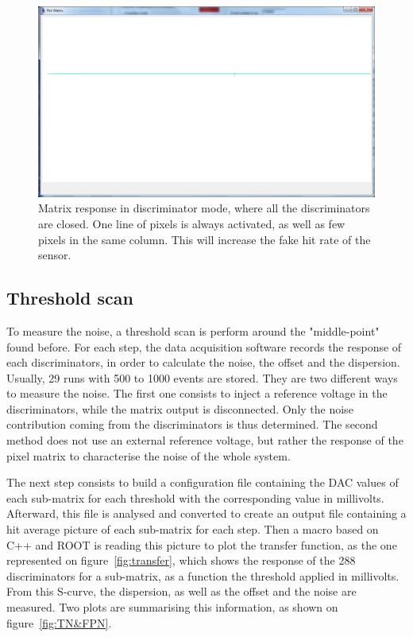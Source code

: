   \begin{figure}[!h]
    \centering
    \includegraphics[width=\textwidth]{Pictures/labTests/th255.png}
    \caption{Matrix response in discriminator mode, where all the discriminators are closed. One line of pixels is always activated, as well as few pixels in the same column. This will increase the fake hit rate of the sensor.}
    \label{fig:closePixel}
  \end{figure}

  \subsection{Threshold scan}

  To measure the noise, a threshold scan is perform around the "middle-point" found before.
  For each step, the data acquisition software records the response of each discriminators, in order to calculate the noise, the offset and the dispersion.
  Usually, 29 runs with 500 to 1000 events are stored.
  They are two different ways to measure the noise. 
  The first one consists to inject a reference voltage in the discriminators, while the matrix output is disconnected.
  Only the noise contribution coming from the discriminators is thus determined.
  The second method does not use an external reference voltage, but rather the response of the pixel matrix to characterise the noise of the whole system.

  The next step consists to build a configuration file containing the DAC values of each sub-matrix for each threshold with the corresponding value in millivolts.
  Afterward, this file is analysed and converted to create an output file containing a hit average picture of each sub-matrix for each step.
  Then a macro based on C++ and ROOT is reading this picture to plot the transfer function, as the one represented on figure~\ref{fig:transfer}, which shows the response of the 288 discriminators for a sub-matrix, as a function the threshold applied in millivolts.
  From this S-curve, the dispersion, as well as the offset and the noise are measured.
  Two plots are summarising this information, as shown on figure~\ref{fig:TN&FPN}.
  
